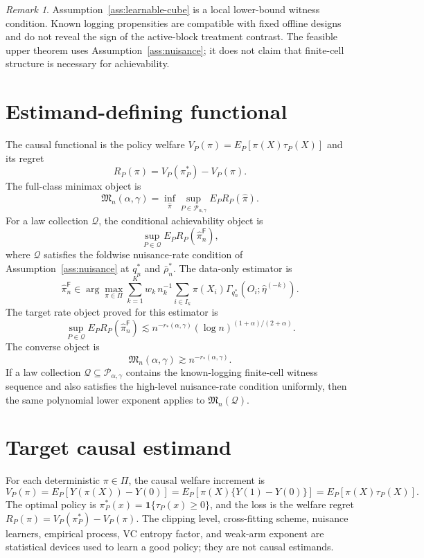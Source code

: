 \documentclass[11pt]{article}
\newcommand{\one}{\mathbf{1}}
\theoremstyle{definition}
\theoremstyle{plain}
\theoremstyle{remark}
\newtheorem{remark}{Remark}
\begin{document}
\begin{remark}
Assumption~\ref{ass:learnable-cube} is a local lower-bound witness condition.
Known logging propensities are compatible with fixed offline designs and do
not reveal the sign of the active-block treatment contrast.  The feasible
upper theorem uses Assumption~\ref{ass:nuisance}; it does not claim that
finite-cell structure is necessary for achievability.
\end{remark}

\section{Estimand-defining functional}
The causal functional is the policy welfare \(V_P(\pi)=E_P[\pi(X)\tau_P(X)]\)
and its regret
\[
R_P(\pi)=V_P(\pi_P^*)-V_P(\pi).
\]
The full-class minimax object is
\[
\mathfrak M_n(\alpha,\gamma)
=\inf_{\widehat\pi}
\sup_{P\in\mathcal P_{\alpha,\gamma}}E_P R_P(\widehat\pi).
\]
For a law collection \(\mathcal Q\), the conditional achievability object is
\[
\sup_{P\in\mathcal Q}E_P R_P(\widehat\pi_n^{\mathsf F}),
\]
where \(\mathcal Q\) satisfies the foldwise nuisance-rate condition of
Assumption~\ref{ass:nuisance} at \(q_n^*\) and \(\bar\rho_n^*\).  The
data-only estimator is
\[
\widehat\pi_n^{\mathsf F}
\in\arg\max_{\pi\in\Pi}
\sum_{k=1}^K w_k\,n_k^{-1}\sum_{i\in I_k}
\pi(X_i)\Gamma_{q_n^*}(O_i;\widehat\eta^{(-k)}).
\]
The target rate object proved for this estimator is
\[
\sup_{P\in\mathcal Q}
E_P R_P(\widehat\pi_n^{\mathsf F})
\lesssim
n^{-r_*(\alpha,\gamma)}(\log n)^{(1+\alpha)/(2+\alpha)}.
\]
The converse object is
\[
\mathfrak M_n(\alpha,\gamma)
\gtrsim n^{-r_*(\alpha,\gamma)}.
\]
If a law collection \(\mathcal Q\subseteq\mathcal P_{\alpha,\gamma}\)
contains the known-logging finite-cell witness sequence and also satisfies
the high-level nuisance-rate condition uniformly, then the same polynomial
lower exponent applies to \(\mathfrak M_n(\mathcal Q)\).

\section{Target causal estimand}
For each deterministic \(\pi\in\Pi\), the causal welfare increment is
\[
V_P(\pi)=E_P[Y(\pi(X))-Y(0)]
=E_P[\pi(X)\{Y(1)-Y(0)\}]
=E_P[\pi(X)\tau_P(X)].
\]
The optimal policy is \(\pi_P^*(x)=\one\{\tau_P(x)\ge0\}\), and the loss is
the welfare regret \(R_P(\pi)=V_P(\pi_P^*)-V_P(\pi)\).  The clipping level,
cross-fitting scheme, nuisance learners, empirical process, VC entropy
factor, and weak-arm exponent are statistical devices used to learn a good
policy; they are not causal estimands.
\end{document}
